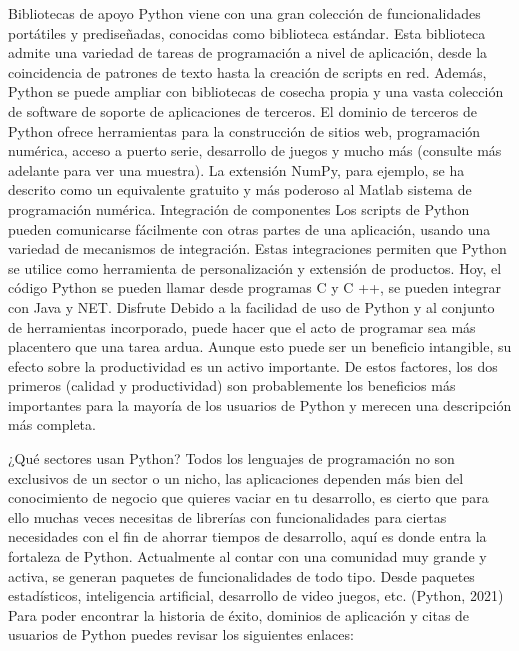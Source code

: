 Bibliotecas de apoyo
Python viene con una gran colección de funcionalidades portátiles y prediseñadas,
conocidas como biblioteca estándar. Esta biblioteca admite una variedad de tareas de
programación a nivel de aplicación, desde la coincidencia de patrones de texto hasta la
creación de scripts en red. Además, Python se puede ampliar con bibliotecas de cosecha
propia y una vasta colección de software de soporte de aplicaciones de terceros. El dominio
de terceros de Python ofrece herramientas
para la construcción de sitios web, programación numérica, acceso a puerto serie,
desarrollo de juegos y mucho más (consulte más adelante para ver una muestra).
La extensión NumPy, para ejemplo, se ha descrito como un equivalente gratuito y más
poderoso al Matlab sistema de programación numérica.
Integración de componentes
Los scripts de Python pueden comunicarse fácilmente con otras partes de una aplicación,
usando una variedad de mecanismos de integración. Estas integraciones permiten que
Python se utilice como herramienta de personalización y extensión de productos. Hoy, el
código Python se pueden llamar desde programas C y C ++, se pueden integrar con Java y
NET.
Disfrute
Debido a la facilidad de uso de Python y al conjunto de herramientas incorporado, puede
hacer que el acto de programar sea más placentero que una tarea ardua.
Aunque esto puede ser un beneficio intangible, su efecto sobre la productividad es un
activo importante. De estos factores, los dos primeros (calidad y productividad) son
probablemente los beneficios más importantes para la mayoría de los usuarios de Python y
merecen una descripción más completa.

¿Qué sectores usan Python?
Todos los lenguajes de programación no son exclusivos de un sector o un nicho, las
aplicaciones dependen más bien del conocimiento de negocio que quieres vaciar en tu
desarrollo, es cierto que para ello muchas veces necesitas de librerías con funcionalidades
para ciertas necesidades con el fin de ahorrar tiempos de desarrollo, aquí es donde entra la
fortaleza de Python.
Actualmente al contar con una comunidad muy grande y activa, se generan paquetes de
funcionalidades de todo tipo. Desde paquetes estadísticos, inteligencia artificial, desarrollo
de video juegos, etc. (Python, 2021)
Para poder encontrar la historia de éxito, dominios de aplicación y citas de usuarios de
Python puedes revisar los siguientes enlaces:


